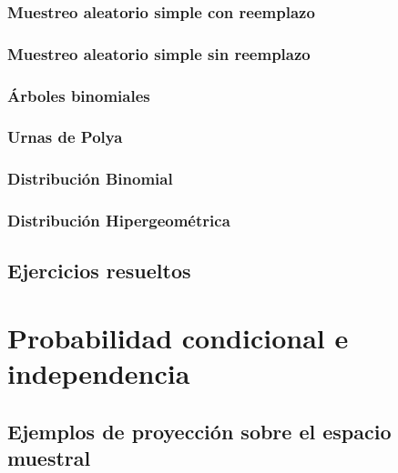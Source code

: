 \documentclass[
]{book}
\begin{document}
\hypertarget{muestreo-aleatorio-simple-con-reemplazo}{%
\subsection{Muestreo aleatorio simple con reemplazo}\label{muestreo-aleatorio-simple-con-reemplazo}}

\hypertarget{muestreo-aleatorio-simple-sin-reemplazo}{%
\subsection{Muestreo aleatorio simple sin reemplazo}\label{muestreo-aleatorio-simple-sin-reemplazo}}

\hypertarget{uxe1rboles-binomiales}{%
\subsection{Árboles binomiales}\label{uxe1rboles-binomiales}}

\hypertarget{urnas-de-polya}{%
\subsection{Urnas de Polya}\label{urnas-de-polya}}

\hypertarget{distribuciuxf3n-binomial}{%
\subsection{Distribución Binomial}\label{distribuciuxf3n-binomial}}

\hypertarget{distribuciuxf3n-hipergeomuxe9trica}{%
\subsection{Distribución Hipergeométrica}\label{distribuciuxf3n-hipergeomuxe9trica}}

\hypertarget{ejercicios-resueltos-1}{%
\section{Ejercicios resueltos}\label{ejercicios-resueltos-1}}

\hypertarget{probacond}{%
\chapter{Probabilidad condicional e independencia}\label{probacond}}

\hypertarget{ejemplos-de-proyecciuxf3n-sobre-el-espacio-muestral}{%
\section{Ejemplos de proyección sobre el espacio muestral}\label{ejemplos-de-proyecciuxf3n-sobre-el-espacio-muestral}}
\end{document}
